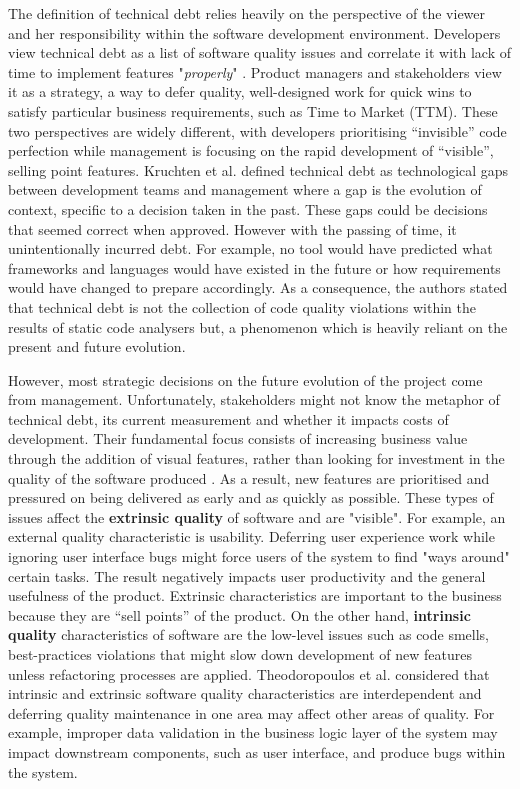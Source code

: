 \documentclass{mprop}
\begin{document}
The definition of technical debt relies heavily on the perspective of the viewer
and her responsibility within the software development environment. Developers
view technical debt as a list of software quality issues and correlate it with
lack of time to implement features "\textit{properly}" \cite{Codabux2013}.
Product managers and stakeholders view it as a strategy, a way to defer quality,
well-designed work for quick wins to satisfy particular business requirements,
such as Time to Market (TTM). These two perspectives are widely different, with
developers prioritising ``invisible'' code perfection while management is
focusing on the rapid development of ``visible'', selling point features.
Kruchten et al. \cite{Kruchten2012} defined technical debt as technological gaps
between development teams and management where a gap is the evolution of
context, specific to a decision taken in the past. These gaps could be decisions
that seemed correct when approved. However with the passing of time, it
unintentionally incurred debt. For example, no tool would have predicted what
frameworks and languages would have existed in the future or how requirements
would have changed to prepare accordingly. As a consequence, the authors stated
that technical debt is not the collection of code quality violations within the
results of static code analysers but, a phenomenon which is heavily reliant on
the present and future evolution.


However, most strategic decisions on the future evolution of the project come
from management. Unfortunately, stakeholders might not know the metaphor of
technical debt, its current measurement and whether it impacts costs of
development. Their fundamental focus consists of increasing business value
through the addition of visual features, rather than looking for investment in
the quality of the software produced \cite{Lim2012}. As a result, new features
are prioritised and pressured on being delivered as early and as quickly as
possible. These types of issues affect the \textbf{extrinsic quality} of
software and are "visible". For example, an external quality characteristic is
usability. Deferring user experience work while ignoring user interface bugs
might force users of the system to find "ways around" certain tasks. The result
negatively impacts user productivity and the general usefulness of the product.
Extrinsic characteristics are important to the business because they are ``sell
points'' of the product. On the other hand, \textbf{intrinsic quality}
characteristics of software are the low-level issues such as code smells,
best-practices violations that might slow down development of new features
unless refactoring processes are applied. Theodoropoulos et al.
\cite{Theodoropoulos2011} considered that intrinsic and extrinsic software
quality characteristics are interdependent and deferring quality maintenance in
one area may affect other areas of quality. For example, improper data
validation in the business logic layer of the system may impact downstream
components, such as user interface, and produce bugs within the system.
\end{document}
